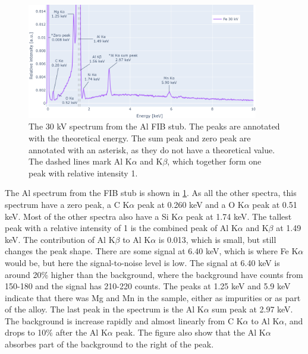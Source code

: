 \begin{figure}[b!]
    \centering
    \includegraphics[width=0.90\textwidth]{figures/each_spectra/Al_everything.png}
    \caption{
        The 30 kV spectrum from the Al FIB stub.
        The peaks are annotated with the theoretical energy.
        The sum peak and zero peak are annotated with an asterisk, as they do not have a theoretical value.
        The dashed lines mark Al K$\alpha$ and K$\beta$, which together form one peak with relative intensity 1.
    }
    \label{fig:results:Spectra_Al}
\end{figure}
The Al spectrum from the FIB stub is shown in \cref{fig:results:Spectra_Al}.
As all the other spectra, this spectrum have a zero peak, a C K$\alpha$ peak at 0.260 keV and a O K$\alpha$ peak at 0.51 keV.
Most of the other spectra also have a Si K$\alpha$ peak at 1.74 keV.
The tallest peak with a relative intensity of 1 is the combined peak of Al K$\alpha$ and K$\beta$ at 1.49 keV.
The contribution of Al K$\beta$ to Al K$\alpha$ is 0.013, which is small, but still changes the peak shape.
There are some signal at 6.40 keV, which is where Fe K$\alpha$ would be, but here the signal-to-noise level is low.
The signal at 6.40 keV is around 20\% higher than the background, where the background have counts from 150-180 and the signal has 210-220 counts.
The peaks at 1.25 keV and 5.9 keV indicate that there was Mg and Mn in the sample, either as impurities or as part of the alloy.
The last peak in the spectrum is the Al K$\alpha$ sum peak at 2.97 keV. %
The background is increase rapidly and almost linearly from C K$\alpha$ to Al K$\alpha$, and drops to 10\% after the Al K$\alpha$ peak.
The figure also show that the Al K$\alpha$ absorbes part of the background to the right of the peak.



